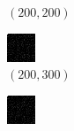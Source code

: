 \documentclass[a4paper, landscape]{article}
\begin{document}
\begin{figure}[H]
\begin{subfigure}{0.09\linewidth}
        \caption*{$(200, 200)$}
    \end{subfigure}
    \begin{subfigure}{0.09\linewidth}
        \centering
        \includegraphics[width=\linewidth]{iht/k = 200, m = 300.png}
        \caption*{$(200, 300)$}
    \end{subfigure}
    \begin{subfigure}{0.09\linewidth}
        \centering
        \includegraphics[width=\linewidth]{iht/k = 200, m = 400.png}

\end{subfigure}
\end{figure}
\end{document}
